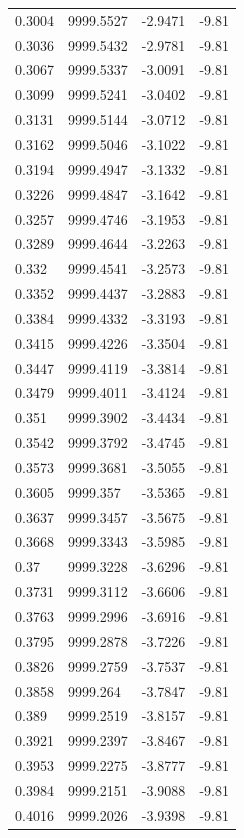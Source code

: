 \begin{table}[H]
\begin{tabular}{llll}
0.3004 & 9999.5527 & -2.9471 & -9.81 \\
0.3036 & 9999.5432 & -2.9781 & -9.81 \\
0.3067 & 9999.5337 & -3.0091 & -9.81 \\
0.3099 & 9999.5241 & -3.0402 & -9.81 \\
0.3131 & 9999.5144 & -3.0712 & -9.81 \\
0.3162 & 9999.5046 & -3.1022 & -9.81 \\
0.3194 & 9999.4947 & -3.1332 & -9.81 \\
0.3226 & 9999.4847 & -3.1642 & -9.81 \\
0.3257 & 9999.4746 & -3.1953 & -9.81 \\
0.3289 & 9999.4644 & -3.2263 & -9.81 \\
0.332 & 9999.4541 & -3.2573 & -9.81 \\
0.3352 & 9999.4437 & -3.2883 & -9.81 \\
0.3384 & 9999.4332 & -3.3193 & -9.81 \\
0.3415 & 9999.4226 & -3.3504 & -9.81 \\
0.3447 & 9999.4119 & -3.3814 & -9.81 \\
0.3479 & 9999.4011 & -3.4124 & -9.81 \\
0.351 & 9999.3902 & -3.4434 & -9.81 \\
0.3542 & 9999.3792 & -3.4745 & -9.81 \\
0.3573 & 9999.3681 & -3.5055 & -9.81 \\
0.3605 & 9999.357 & -3.5365 & -9.81 \\
0.3637 & 9999.3457 & -3.5675 & -9.81 \\
0.3668 & 9999.3343 & -3.5985 & -9.81 \\
0.37 & 9999.3228 & -3.6296 & -9.81 \\
0.3731 & 9999.3112 & -3.6606 & -9.81 \\
0.3763 & 9999.2996 & -3.6916 & -9.81 \\
0.3795 & 9999.2878 & -3.7226 & -9.81 \\
0.3826 & 9999.2759 & -3.7537 & -9.81 \\
0.3858 & 9999.264 & -3.7847 & -9.81 \\
0.389 & 9999.2519 & -3.8157 & -9.81 \\
0.3921 & 9999.2397 & -3.8467 & -9.81 \\
0.3953 & 9999.2275 & -3.8777 & -9.81 \\
0.3984 & 9999.2151 & -3.9088 & -9.81 \\
0.4016 & 9999.2026 & -3.9398 & -9.81 \\

\end{tabular}
\end{table}
